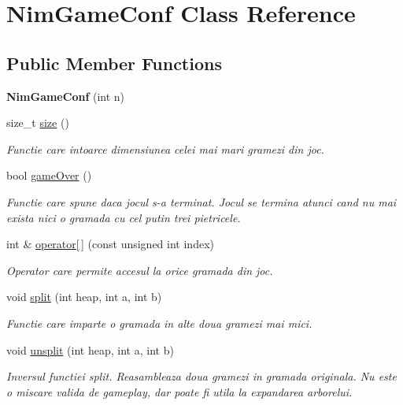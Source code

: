 \hypertarget{classNimGameConf}{
\section{NimGameConf Class Reference}
\label{classNimGameConf}
}
\subsection*{Public Member Functions}
\begin{DoxyCompactItemize}
\item 
\hypertarget{classNimGameConf_aca38313f09d82be07a32770a9f6875cc}{
{\bfseries NimGameConf} (int n)}
\label{classNimGameConf_aca38313f09d82be07a32770a9f6875cc}

\item 
size\_\-t \hyperlink{classNimGameConf_a6562b1e5b81ef42b350abdb7b3f024be}{size} ()
\begin{DoxyCompactList}\small\item\em Functie care intoarce dimensiunea celei mai mari gramezi din joc. \end{DoxyCompactList}\item 
bool \hyperlink{classNimGameConf_a9d882cf631a20956c0e542dd71a8b726}{gameOver} ()
\begin{DoxyCompactList}\small\item\em Functie care spune daca jocul s-\/a terminat. Jocul se termina atunci cand nu mai exista nici o gramada cu cel putin trei pietricele. \end{DoxyCompactList}\item 
\hypertarget{classNimGameConf_ad8c71ec49bf1a773c169f6a57523309e}{
int \& \hyperlink{classNimGameConf_ad8c71ec49bf1a773c169f6a57523309e}{operator\mbox{[}$\,$\mbox{]}} (const unsigned int index)}
\label{classNimGameConf_ad8c71ec49bf1a773c169f6a57523309e}

\begin{DoxyCompactList}\small\item\em Operator care permite accesul la orice gramada din joc. \end{DoxyCompactList}\item 
void \hyperlink{classNimGameConf_ad19bf383bbd4eafc893491e31059d777}{split} (int heap, int a, int b)
\begin{DoxyCompactList}\small\item\em Functie care imparte o gramada in alte doua gramezi mai mici. \end{DoxyCompactList}\item 
\hypertarget{classNimGameConf_a8001a96febdfe2ce67ae8cee025a89e0}{
void \hyperlink{classNimGameConf_a8001a96febdfe2ce67ae8cee025a89e0}{unsplit} (int heap, int a, int b)}
\label{classNimGameConf_a8001a96febdfe2ce67ae8cee025a89e0}

\begin{DoxyCompactList}\small\item\em Inversul functiei split. Reasambleaza doua gramezi in gramada originala. Nu este o miscare valida de gameplay, dar poate fi utila la expandarea arborelui. \end{DoxyCompactList}\end{DoxyCompactItemize}
